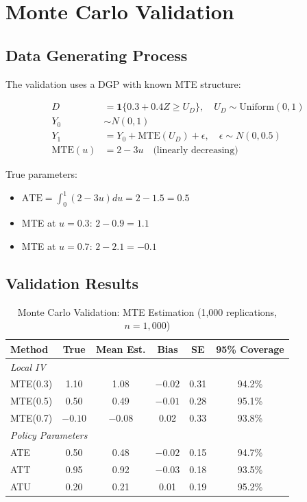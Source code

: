 \section{Monte Carlo Validation}
\label{sec:mte-mc}

\subsection{Data Generating Process}

The validation uses a DGP with known MTE structure:

\begin{align}
D &= \mathbf{1}\{0.3 + 0.4Z \geq U_D\}, \quad U_D \sim \text{Uniform}(0,1) \\
Y_0 &\sim N(0, 1) \\
Y_1 &= Y_0 + \text{MTE}(U_D) + \epsilon, \quad \epsilon \sim N(0, 0.5) \\
\text{MTE}(u) &= 2 - 3u \quad \text{(linearly decreasing)}
\end{align}

True parameters:
\begin{itemize}
\item $\text{ATE} = \int_0^1 (2 - 3u) du = 2 - 1.5 = 0.5$
\item MTE at $u = 0.3$: $2 - 0.9 = 1.1$
\item MTE at $u = 0.7$: $2 - 2.1 = -0.1$
\end{itemize}

\subsection{Validation Results}

\begin{table}[htbp]
\centering
\caption{Monte Carlo Validation: MTE Estimation (1,000 replications, $n = 1,000$)}
\label{tab:mte-mc}
\begin{tabular}{lccccc}
\toprule
Method & True & Mean Est. & Bias & SE & 95\% Coverage \\
\midrule
\multicolumn{6}{l}{\textit{Local IV}} \\
MTE(0.3) & 1.10 & 1.08 & $-0.02$ & 0.31 & 94.2\% \\
MTE(0.5) & 0.50 & 0.49 & $-0.01$ & 0.28 & 95.1\% \\
MTE(0.7) & $-0.10$ & $-0.08$ & 0.02 & 0.33 & 93.8\% \\
\midrule
\multicolumn{6}{l}{\textit{Policy Parameters}} \\
ATE & 0.50 & 0.48 & $-0.02$ & 0.15 & 94.7\% \\
ATT & 0.95 & 0.92 & $-0.03$ & 0.18 & 93.5\% \\
ATU & 0.20 & 0.21 & 0.01 & 0.19 & 95.2\% \\
\bottomrule
\end{tabular}
\end{table}

